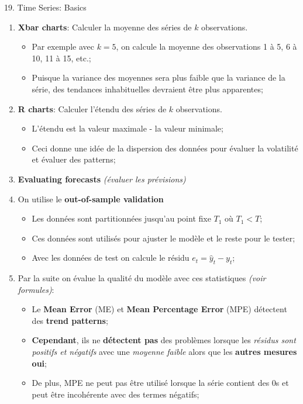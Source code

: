 \documentclass[12pt, titlepage, french]{report}
\begin{document}
\begin{CHPT_SUMM}{19. Time Series: Basics}
\begin{enumerate}
\begin{itemize}
		\item	On peut donc évaluer si un processus est stable (en contrôle) ou instable (hors de contrôle)
	\end{itemize}
	\item[]	\textbf{Xbar charts}: Calculer la moyenne des séries de $k$ observations.
		\begin{itemize}
		\item	Par exemple avec $k = 5$, on calcule la moyenne des observations 1 à 5, 6 à 10, 11 à 15, etc.;
		\item	Puisque la variance des moyennes sera plus faible que la variance de la série, des tendances inhabituelles devraient être plus apparentes;
		\end{itemize}
	\item[]	\textbf{R charts}: Calculer l'étendu des séries de $k$ observations.
		\begin{itemize}
		\item	L'étendu est la valeur maximale - la valeur minimale;
		\item	Ceci donne une idée de la dispersion des données pour évaluer la volatilité et évaluer des patterns;
		\end{itemize}
	\item	\textbf{Evaluating forecasts} \textit{(évaluer les prévisions)}
	\item[]	On utilise le \textbf{out-of-sample validation}
		\begin{itemize}
		\item	Les données sont partitionnées jusqu'au point fixe $T_{1}$ où $T_{1} < T$;
		\item	Ces données sont utilisés pour ajuster le modèle et le reste pour le tester;
		\item	Avec les données de test on calcule le résidu $e_{t} = \hat{y}_{t} - y_{t}$;
		\end{itemize}
	\item[]	Par la suite on évalue la qualité du modèle avec ces statistiques \emph{(voir formules)}:
	\begin{itemize}
		\item	Le \textbf{Mean Error} (ME) et \textbf{Mean Percentage Error} (MPE) détectent des \textbf{trend patterns};
		\item	\textbf{Cependant}, ils ne \textbf{détectent pas} des problèmes lorsque les \textit{résidus sont positifs et négatifs} avec une \textit{moyenne faible} alors que les \textbf{autres mesures oui};
		\item	De plus, MPE ne peut pas être utilisé lorsque la série contient des 0s et peut être incohérente avec des termes négatifs;

\end{itemize}
\end{enumerate}
\end{CHPT_SUMM}
\end{document}
